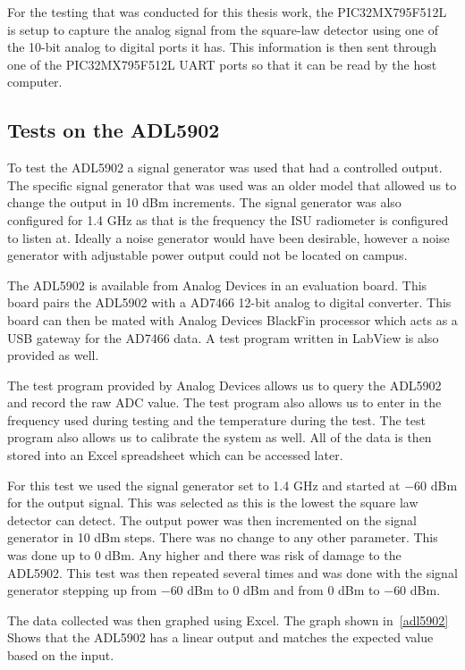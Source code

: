 For the testing that was conducted for this thesis work, the PIC32MX795F512L is setup to capture the analog signal from the square-law detector using one of the 10-bit analog to digital ports it has.  This information is then sent through one of the PIC32MX795F512L UART ports so that it can be read by the host computer.


\subsection{Tests on the ADL5902}
To test the ADL5902 a signal generator was used that had a controlled output.  The specific signal generator that was used was an older model that allowed us to change the output in 10 dBm increments.  The signal generator was also configured for 1.4 GHz as that is the frequency the ISU radiometer is configured to listen at.  Ideally a noise generator would have been desirable, however a noise generator with adjustable power output could not be located on campus.  

The ADL5902 is available from Analog Devices in an evaluation board.  This board pairs the ADL5902 with a AD7466 12-bit analog to digital converter.  This board can then be mated with Analog Devices BlackFin processor which acts as a USB gateway for the AD7466 data.  A test program written in LabView is also provided as well.

The test program provided by Analog Devices allows us to query the ADL5902 and record the raw ADC value.  The test program also allows us to enter in the frequency used during testing and the temperature during the test.  The test program also allows us to calibrate the system as well.  All of the data is then stored into an Excel spreadsheet which can be accessed later.

For this test we used the signal generator set to 1.4 GHz and started at $-60$ dBm for the output signal.  This was selected as this is the lowest the square law detector can detect.  The output power was then incremented on the signal generator in 10 dBm steps.  There was no change to any other parameter.  This was done up to 0 dBm.  Any higher and there was risk of damage to the ADL5902.  This test was then repeated several times and was done with the signal generator stepping up from $-60$ dBm to 0 dBm and from 0 dBm to $-60$ dBm.  

The data collected was then graphed using Excel.  The graph shown in~\ref{adl5902}
Shows that the ADL5902 has a linear output and matches the expected value based on the input.  

